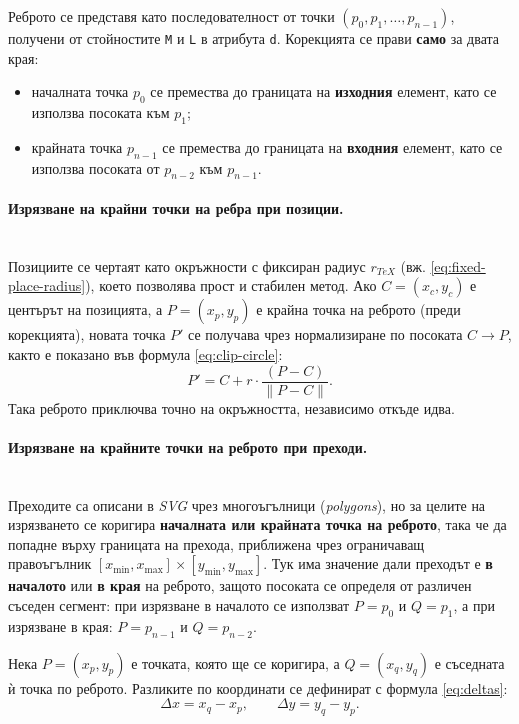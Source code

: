 Реброто се представя като последователност от точки
\((p_0, p_1, \dots, p_{n-1})\), получени от стойностите \texttt{M} и \texttt{L} в атрибута \texttt{d}.
Корекцията се прави \textbf{само} за двата края:
\begin{itemize}
  \item началната точка \(p_0\) се премества до границата на \textbf{изходния} елемент, като се използва посоката към \(p_1\);
  \item крайната точка \(p_{n-1}\) се премества до границата на \textbf{входния} елемент, като се използва посоката от \(p_{n-2}\) към \(p_{n-1}\).
\end{itemize}

\paragraph{Изрязване на крайни точки на ребра при позиции.}
\mbox{}\\
Позициите се чертаят като окръжности с фиксиран радиус \(r_{\textit{TeX}}\) (вж. \eqref{eq:fixed-place-radius}), което позволява прост и стабилен метод. Ако \(C=(x_c,y_c)\) е центърът на позицията, а \(P=(x_p,y_p)\) е крайна точка на реброто (преди корекцията), новата точка \(P'\) се получава чрез нормализиране по посоката \(C \rightarrow P\), както е показано във формула \eqref{eq:clip-circle}:
\begin{equation}
P' = C + r \cdot \frac{(P - C)}{\lVert P - C \rVert}.
\label{eq:clip-circle}
\end{equation}
Така реброто приключва точно на окръжността, независимо откъде идва.

\paragraph{Изрязване на крайните точки на реброто при преходи.}
\mbox{}\\
Преходите са описани в \textit{SVG} чрез многоъгълници (\textit{polygons}), но за целите на изрязването се коригира \textbf{началната или крайната точка на реброто}, така че да попадне върху границата на прехода, приближена чрез ограничаващ правоъгълник
\([x_{\min},x_{\max}] \times [y_{\min},y_{\max}]\).
Тук има значение дали преходът е \textbf{в началото} или \textbf{в края} на реброто, защото посоката се определя от различен съседен сегмент: при изрязване в началото се използват \(P=p_0\) и \(Q=p_1\), а при изрязване в края: \(P=p_{n-1}\) и \(Q=p_{n-2}\).

Нека \(P=(x_p,y_p)\) е точката, която ще се коригира, а \(Q=(x_q,y_q)\) е съседната ѝ точка по реброто. Разликите по координати се дефинират с формула \eqref{eq:deltas}:
\begin{equation}
\Delta x = x_q - x_p,\qquad \Delta y = y_q - y_p.
\label{eq:deltas}
\end{equation}

